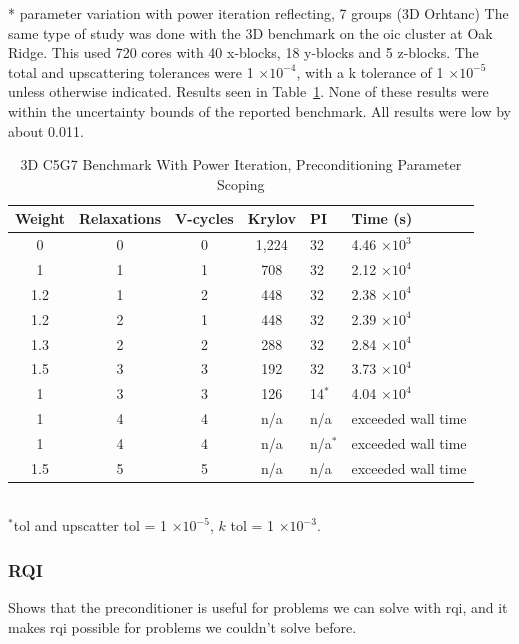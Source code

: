 * parameter variation with power iteration reflecting, 7 groups (3D Orhtanc)
The same type of study was done with the 3D benchmark on the oic cluster at Oak Ridge. This used 720 cores with 40 x-blocks, 18 y-blocks and 5 z-blocks. The total and upscattering tolerances were 1 $\times 10^{-4}$, with a k tolerance of 1 $\times 10^{-5}$ unless otherwise indicated. Results seen in Table~\ref{table:3D c5g7}. None of these results were within the uncertainty bounds of the reported benchmark. All results were low by about 0.011.
%
\begin{table}[!h]
\caption{3D C5G7 Benchmark With Power Iteration, Preconditioning Parameter Scoping}
\begin{center}
\begin{tabular}{c c c c l l}
\hline
Weight & Relaxations & V-cycles & Krylov & PI & Time (s) \\[0.5ex]
\hline
0    & 0 & 0 & 1,224 & 32 & 4.46 $\times 10^{3}$ \\
1    & 1 & 1 & 708    & 32 & 2.12 $\times 10^{4}$ \\
1.2 & 1 & 2 & 448    & 32 & 2.38 $\times 10^{4}$ \\
1.2 & 2 & 1 & 448    & 32 & 2.39 $\times 10^{4}$ \\
1.3 & 2 & 2 & 288    & 32 & 2.84 $\times 10^{4}$ \\
1.5 & 3 & 3 & 192    & 32 & 3.73 $\times 10^{4}$ \\
1    & 3 & 3 & 126    & 14$^{*}$  & 4.04 $\times 10^{4}$ \\
1    & 4 & 4 & n/a     & n/a          & exceeded wall time \\
1    & 4 & 4 & n/a     & n/a$^{*}$ & exceeded wall time \\
1.5 & 5 & 5 & n/a     & n/a          & exceeded wall time \\
\hline 
\end{tabular}\\
$^{*}$tol and upscatter tol = 1 $\times 10^{-5}$, $k$ tol = 1 $\times 10^{-3}$.
\end{center}
\label{table:3D c5g7}
\end{table}

\subsubsection{RQI}
Shows that the preconditioner is useful for problems we can solve with rqi, and it makes rqi possible for problems we couldn't solve before. 

